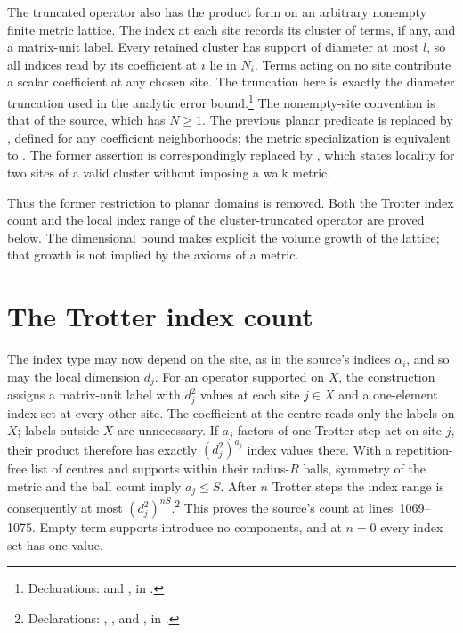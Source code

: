 \documentclass{article}
\begin{document}
The truncated operator also has the product form on an arbitrary nonempty
finite metric lattice. The index at each site records its cluster of terms,
if any, and a matrix-unit label. Every retained cluster has support of
diameter at most $l$, so all indices read by its coefficient at $i$ lie in
$N_i$. Terms acting on no site contribute a scalar coefficient at any
chosen site. The truncation here is exactly the diameter truncation used
in the analytic error bound.\footnote{Declarations:
and
,
in .}
The nonempty-site convention is that of the source, which has $N\ge1$.
The previous planar predicate
\texttt{} is replaced by
, defined for any
coefficient neighborhoods; the metric specialization is equivalent to
. The former assertion
\texttt{} is
correspondingly replaced by
, which
states locality for two sites of a valid cluster without imposing a walk metric.

Thus the former restriction to planar domains is removed. Both the Trotter
index count and the local index range of the cluster-truncated operator are
proved below. The dimensional bound makes explicit the volume growth of
the lattice; that growth is not implied by the axioms of a metric.

\section{The Trotter index count}

The index type may now depend on the site, as in the source's indices
$\alpha_i$, and so may the local dimension $d_j$. For an operator supported
on $X$, the construction assigns a matrix-unit label with $d_j^2$ values at
each site $j\in X$ and a one-element index set at every other site. The
coefficient at the centre reads only the labels on $X$; labels outside $X$
are unnecessary. If $a_j$ factors of one Trotter step act on site $j$, their
product therefore has exactly $(d_j^2)^{a_j}$ index values there. With a
repetition-free list of centres and supports within their radius-$R$ balls,
symmetry of the metric and the ball count imply $a_j\le S$. After $n$
Trotter steps the index range is consequently at most
$(d_j^2)^{nS}$.\footnote{Declarations:
,
, and
,
in .}
This proves the source's count at lines~1069--1075. Empty term supports
introduce no components, and at $n=0$ every index set has one value.
\end{document}
